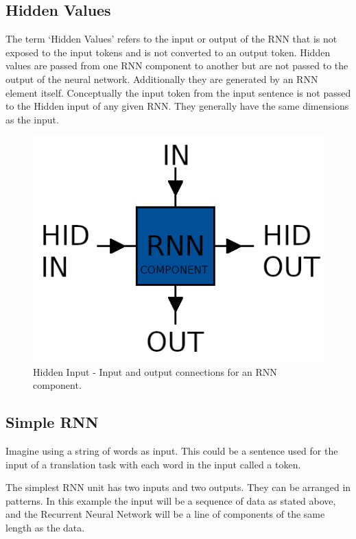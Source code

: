 \subsection{Hidden Values}
The term `Hidden Values' refers to the input or output of the RNN that is not exposed to the input tokens and is not converted to an output token. Hidden values are passed from one RNN component to another but are not passed to the output of the neural network. Additionally they are generated by an RNN element itself. Conceptually the input token from the input sentence is not passed to the Hidden input of any given RNN. They generally have the same dimensions as the input.

\begin{figure}[H]
	\begin{center}
		
		\includegraphics[scale=2.0]{diagram-hidden}
		
	\end{center}
	\caption[Hidden Input]{Hidden Input - Input and output connections for an RNN component.}
	\label{diagram-hidden}
	
\end{figure}


\subsection{Simple RNN}

Imagine using a string of words as input. This could be a sentence used for the input of a translation task with each word in the input called a token.

The simplest RNN unit has two inputs and two outputs. They can be arranged in patterns. In this example the input will be a sequence of data as stated above, and the Recurrent Neural Network will be a line of components of the same length as the data.

